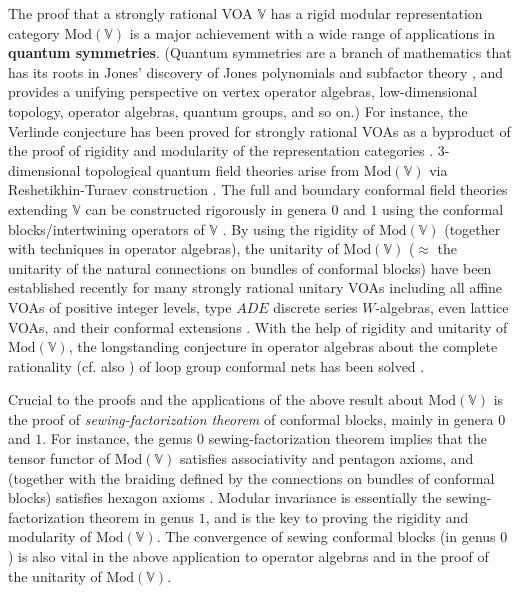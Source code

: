 \documentclass[11pt,b5paper,notitlepage]{article}
\theoremstyle{definition}
\theoremstyle{plain}
\newcommand{\Vbb}{\mathbb V}
\newcommand{\<}{\left\langle}
\renewcommand{\>}{\right\rangle}
\newcommand{\Mod}{\mathrm{Mod}}
\numberwithin{equation}{section}
\begin{document}
The proof that a strongly rational VOA $\Vbb$ has a rigid modular representation category $\Mod(\Vbb)$ is a major achievement with a wide range of applications in \textbf{quantum symmetries}. (Quantum symmetries are a branch of mathematics that has its roots in Jones' discovery of Jones polynomials \cite{Jones-polynomials} and subfactor theory \cite{Jones-subfactors}, and provides a unifying perspective on vertex operator algebras, low-dimensional topology, operator algebras, quantum groups, and so on.) For instance, the Verlinde conjecture has been proved for strongly rational VOAs as a byproduct of the proof of rigidity and modularity of the representation categories \cite{Hua-Verlinde}. $3$-dimensional topological quantum field theories arise from $\Mod(\Vbb)$ via Reshetikhin-Turaev construction \cite{RT-ribbon,RT-TQFT,Tur-TQFT}. The full and boundary conformal field theories extending $\Vbb$ can be constructed rigorously in genera $0$ and $1$ using the conformal blocks/intertwining operators of $\Vbb$ \cite{FRS-TFT-1,HK-open,FFRS-TFT-5,HK-full,Kong-full,FFRS-uniqueness,Kong-Cardy,HK-modular-invariance}. By using the rigidity of $\Mod(\Vbb)$ (together with techniques in operator algebras), the unitarity of $\Mod(\Vbb)$ ($\approx$ the unitarity of the natural connections on bundles of conformal blocks) have been established recently for many strongly rational unitary VOAs including all affine VOAs of positive integer levels, type $ADE$ discrete series $W$-algebras, even lattice VOAs, and their conformal extensions \cite{Gui-unitary-1,Gui-unitary-2,Gui-Q-systems,Gui-categorical,Tener-fusion,Gui-unbounded,CGGH}. With the help of rigidity and unitarity of $\Mod(\Vbb)$, the longstanding conjecture in operator algebras about the complete rationality \cite{KLM} (cf. also \cite{Xu-JW,LX-dichotomy}) of loop group conformal nets has been solved \cite{Was-fusion,Gui-categorical,Tener-fusion}.





Crucial to the proofs and the applications of the above result about $\Mod(\Vbb)$ is the proof of \emph{sewing-factorization theorem} of conformal blocks, mainly in genera $0$ and $1$. For instance, the genus $0$ sewing-factorization theorem implies that the tensor functor of $\Mod(\Vbb)$ satisfies associativity and pentagon axioms, and (together with the braiding defined by the connections on bundles of conformal blocks) satisfies hexagon axioms \cite{Hua-tensor-4,NT-P1_conformal_blocks,Hua-rigidity-modularity}. Modular invariance \cite{Zhu-modular-invariance,DLM-modular-invariance,Hua-differential-genus-1} is essentially the sewing-factorization theorem in genus $1$, and is the key to proving the rigidity and modularity of $\Mod(\Vbb)$. The convergence of sewing conformal blocks (in genus $0$) is also vital in the above application to operator algebras and in the proof of the unitarity of $\Mod(\Vbb)$.
\end{document}
